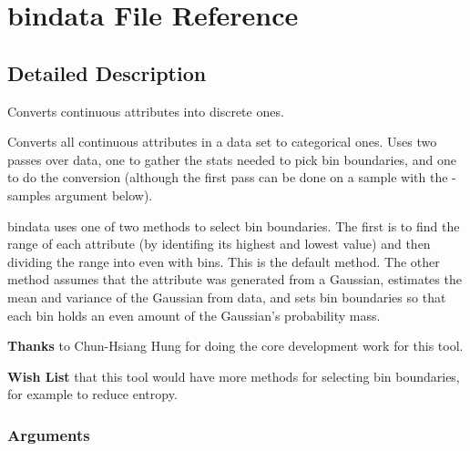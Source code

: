 \section{bindata File Reference}
\label{bindata}


\subsection{Detailed Description}
Converts continuous attributes into discrete ones. 

Converts all continuous attributes in a data set to categorical ones. Uses two passes over data, one to gather the stats needed to pick bin boundaries, and one to do the conversion (although the first pass can be done on a sample with the -samples argument below).

bindata uses one of two methods to select bin boundaries. The first is to find the range of each attribute (by identifing its highest and lowest value) and then dividing the range into even with bins. This is the default method. The other method assumes that the attribute was generated from a Gaussian, estimates the mean and variance of the Gaussian from data, and sets bin boundaries so that each bin holds an even amount of the Gaussian's probability mass.

\begin{Desc}
\item[{\bf Thanks}]to Chun-Hsiang Hung for doing the core development work for this tool. \end{Desc}


\begin{Desc}
\item[{\bf Wish List}]that this tool would have more methods for selecting bin boundaries, for example to reduce entropy. \end{Desc}
\subsubsection*{Arguments}

